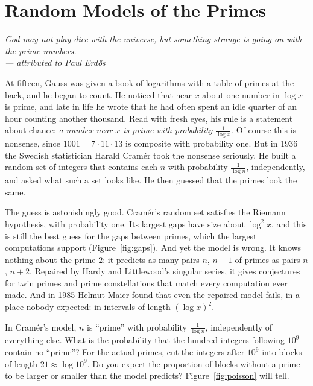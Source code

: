 \chapter{Random Models of the Primes}

\begin{center}\itshape
God may not play dice with the universe, but something strange is going on with the prime numbers.\\
\upshape --- attributed to Paul Erd\H{o}s
\end{center}

At fifteen, Gauss was given a book of logarithms with a table of primes at the back, and he began to count. He noticed that near $x$ about one number in $\log x$ is prime, and late in life
he wrote that he had often spent an idle quarter of an hour counting another thousand. Read with fresh eyes, his rule is a statement about chance: \emph{a number near $x$ is prime with probability
$\frac1{\log x}$}. Of course this is nonsense, since $1001=7\cdot11\cdot13$ is composite with probability one. But in 1936 the Swedish statistician Harald Cramér took the nonsense
seriously. He built a random set of integers that contains each $n$ with probability $\frac1{\log n}$, independently, and asked what such a set looks like. He then guessed that the primes look the same.

The guess is astonishingly good. Cramér's random set satisfies the Riemann hypothesis, with probability one. Its largest gaps have size about $\log^2x$, and this is still the best guess
for the gaps between primes, which the largest computations support (Figure~\ref{fig:gaps}). And yet the model is wrong. It knows nothing about the prime $2$: it predicts as many pairs $n$, $n+1$
of primes as pairs $n$, $n+2$. Repaired by Hardy and Littlewood's singular series, it gives conjectures for twin primes and prime constellations that match every computation ever made. And in 1985 Helmut Maier found that even the repaired
model fails, in a place nobody expected: in intervals of length $(\log x)^2$.

\begin{think}
In Cramér's model, $n$ is ``prime'' with probability $\frac1{\log n}$, independently of everything else. What is the probability that the hundred integers following $10^{9}$ contain no ``prime''? For the actual primes, cut the integers after $10^9$ into blocks of length $21\approx\log10^9$. Do you expect the proportion of
blocks without a prime to be larger or smaller than the model predicts? Figure~\ref{fig:poisson} will tell.
\end{think}

